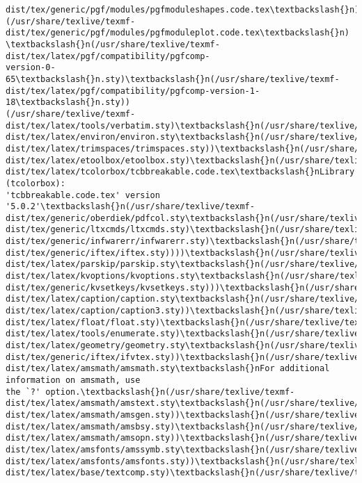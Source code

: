 \documentclass[11pt]{article}
\begin{document}
\begin{Verbatim}[commandchars=\\\{\}]
dist/tex/generic/pgf/modules/pgfmoduleshapes.code.tex\textbackslash{}n)
(/usr/share/texlive/texmf-dist/tex/generic/pgf/modules/pgfmoduleplot.code.tex\textbackslash{}n)
\textbackslash{}n(/usr/share/texlive/texmf-dist/tex/latex/pgf/compatibility/pgfcomp-
version-0-65\textbackslash{}n.sty)\textbackslash{}n(/usr/share/texlive/texmf-
dist/tex/latex/pgf/compatibility/pgfcomp-version-1-18\textbackslash{}n.sty))
(/usr/share/texlive/texmf-
dist/tex/latex/tools/verbatim.sty)\textbackslash{}n(/usr/share/texlive/texmf-
dist/tex/latex/environ/environ.sty\textbackslash{}n(/usr/share/texlive/texmf-
dist/tex/latex/trimspaces/trimspaces.sty))\textbackslash{}n(/usr/share/texlive/texmf-
dist/tex/latex/etoolbox/etoolbox.sty)\textbackslash{}n(/usr/share/texlive/texmf-
dist/tex/latex/tcolorbox/tcbbreakable.code.tex\textbackslash{}nLibrary (tcolorbox):
'tcbbreakable.code.tex' version '5.0.2'\textbackslash{}n(/usr/share/texlive/texmf-
dist/tex/generic/oberdiek/pdfcol.sty\textbackslash{}n(/usr/share/texlive/texmf-
dist/tex/generic/ltxcmds/ltxcmds.sty)\textbackslash{}n(/usr/share/texlive/texmf-
dist/tex/generic/infwarerr/infwarerr.sty)\textbackslash{}n(/usr/share/texlive/texmf-
dist/tex/generic/iftex/iftex.sty))))\textbackslash{}n(/usr/share/texlive/texmf-
dist/tex/latex/parskip/parskip.sty\textbackslash{}n(/usr/share/texlive/texmf-
dist/tex/latex/kvoptions/kvoptions.sty\textbackslash{}n(/usr/share/texlive/texmf-
dist/tex/generic/kvsetkeys/kvsetkeys.sty)))\textbackslash{}n(/usr/share/texlive/texmf-
dist/tex/latex/caption/caption.sty\textbackslash{}n(/usr/share/texlive/texmf-
dist/tex/latex/caption/caption3.sty))\textbackslash{}n(/usr/share/texlive/texmf-
dist/tex/latex/float/float.sty)\textbackslash{}n(/usr/share/texlive/texmf-
dist/tex/latex/tools/enumerate.sty)\textbackslash{}n(/usr/share/texlive/texmf-
dist/tex/latex/geometry/geometry.sty\textbackslash{}n(/usr/share/texlive/texmf-
dist/tex/generic/iftex/ifvtex.sty))\textbackslash{}n(/usr/share/texlive/texmf-
dist/tex/latex/amsmath/amsmath.sty\textbackslash{}nFor additional information on amsmath, use
the `?' option.\textbackslash{}n(/usr/share/texlive/texmf-
dist/tex/latex/amsmath/amstext.sty\textbackslash{}n(/usr/share/texlive/texmf-
dist/tex/latex/amsmath/amsgen.sty))\textbackslash{}n(/usr/share/texlive/texmf-
dist/tex/latex/amsmath/amsbsy.sty)\textbackslash{}n(/usr/share/texlive/texmf-
dist/tex/latex/amsmath/amsopn.sty))\textbackslash{}n(/usr/share/texlive/texmf-
dist/tex/latex/amsfonts/amssymb.sty\textbackslash{}n(/usr/share/texlive/texmf-
dist/tex/latex/amsfonts/amsfonts.sty))\textbackslash{}n(/usr/share/texlive/texmf-
dist/tex/latex/base/textcomp.sty)\textbackslash{}n(/usr/share/texlive/texmf-

\end{Verbatim}
\end{document}
